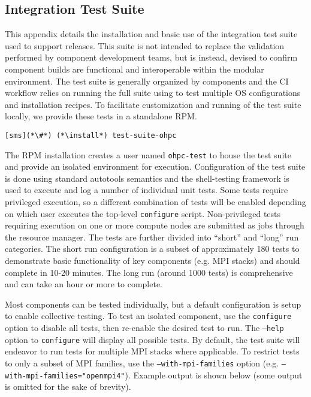 \clearpage
\subsection{Integration Test Suite}  \label{appendix:test_suite}

This appendix details the installation and basic use of the integration test
suite used to support \OHPC{} releases. This suite is not intended to replace
the validation performed by component development teams, but is instead,
devised to confirm component builds are functional and interoperable within
the modular \OHPC{} environment.
The test suite is generally organized by components and the \OHPC{} CI workflow
relies on running the full suite using \href{https://jenkins.io}{\color{blue}{Jenkins}} to test
multiple OS configurations and installation recipes.
To facilitate customization and running of the test suite locally, we 
provide these tests in a standalone RPM. 

\begin{lstlisting}
[sms](*\#*) (*\install*) test-suite-ohpc
\end{lstlisting}

The RPM installation creates a user named \texttt{ohpc-test} to house the test
suite and provide an isolated environment for execution.  Configuration of the
test suite is done using standard \GNU{} autotools semantics and the
\href{https://jenkins.io}{\color{blue}{BATS}} shell-testing framework is used
to execute and log a number of individual unit tests.  Some tests require
privileged execution, so a different combination of tests will be enabled
depending on which user executes the top-level \texttt{configure}
script. Non-privileged tests requiring execution on one or more compute nodes are
submitted as jobs through the \rms{} resource manager. The tests are further
divided into ``short'' and ``long'' run categories. The short run configuration
is a subset
of approximately 180 tests to demonstrate basic functionality of key components
(e.g. MPI stacks) and should complete in 10-20 minutes. The long run (around
1000 tests) is comprehensive and can take an hour or more to complete.

Most components can be tested individually, but a default configuration is
setup to enable collective testing. To test an isolated component, use the
\texttt{configure} option to disable all tests, then re-enable the desired test
to run. The \texttt{--help} option to \texttt{configure} will display all
possible tests. By default, the test suite will endeavor to run tests for
multiple MPI stacks where applicable. To restrict tests to only a subset of MPI
families, use the \texttt{--with-mpi-families} option
(e.g. \texttt{--with-mpi-families="openmpi4"}). Example output is shown below
(some output is omitted for the sake of brevity).

